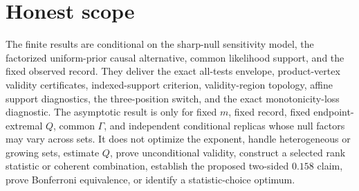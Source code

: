 \documentclass{article}
\begin{document}
\section{Honest scope}

The finite results are conditional on the sharp-null sensitivity model, the factorized uniform-prior causal alternative, common likelihood support, and the fixed observed record. They deliver the exact all-tests envelope, product-vertex validity certificates, indexed-support criterion, validity-region topology, affine support diagnostics, the three-position switch, and the exact monotonicity-loss diagnostic. The asymptotic result is only for fixed \(m\), fixed record, fixed endpoint-extremal \(Q\), common \(\Gamma\), and independent conditional replicas whose null factors may vary across sets. It does not optimize the exponent, handle heterogeneous or growing sets, estimate \(Q\), prove unconditional validity, construct a selected rank statistic or coherent combination, establish the proposed two-sided \(0.158\) claim, prove Bonferroni equivalence, or identify a statistic-choice optimum.
\end{document}
